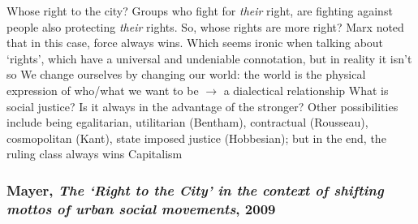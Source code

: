 \documentclass{article}
\begin{document}
\begin{outline}
	\1 Whose right to the city? Groups who fight for \textit{their} right, are fighting against people also protecting \textit{their} rights. So, whose rights are more right? Marx noted that in this case, force always wins. Which seems ironic when talking about `rights', which have a universal and undeniable connotation, but in reality it isn't so
	\1 We change ourselves by changing our world: the world is the physical expression of who/what we want to be $\rightarrow$ a dialectical relationship
	\1 What is social justice? Is it always in the advantage of the stronger? Other possibilities include being egalitarian, utilitarian (Bentham), contractual (Rousseau), cosmopolitan (Kant), state imposed justice (Hobbesian); but in the end, the ruling class always wins
	\1 Capitalism
\end{outline}

\subsubsection{Mayer, \textit{The `Right to the City' in the context of shifting mottos of urban social movements}, 2009}
\end{document}
